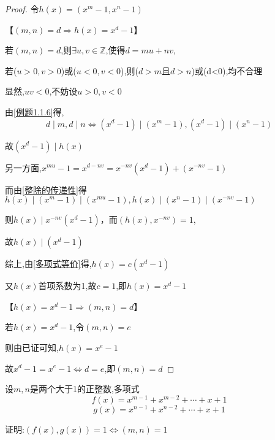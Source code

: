 \begin{proof}
    令$h(x)=(x^m-1,x^n-1)$

    【$(m,n)=d \Longrightarrow h(x)=x^d-1$】 

    若$(m,n)=d$,则$\exists u,v\in \mathbb{Z}$,使得$d=mu+nv$,

    若($u>0,v>0$)或($u<0,v<0$),则($d>m$且$d>n$)或(d<0),均不合理

    显然,$uv<0$,不妨设$u>0,v<0$

    由\cref{例题1.1.6}得,
    $$d\mid m,d\mid n \Longleftrightarrow (x^d-1)\mid (x^m-1),(x^d-1)\mid (x^n-1)$$

    故$(x^d-1)\mid h(x)$

    另一方面,$x^{mu}-1=x^{d-nv}=x^{-nv}(x^d-1)+(x^{-nv}-1)$

    而由\cref{整除的传递性}得$h(x)\mid (x^m-1)\mid (x^{mu}-1),h(x)\mid (x^n-1) \mid (x^{-nv}-1)$

    则$h(x)\mid x^{-nv}(x^d-1)$，而$(h(x),x^{-nv})=1$,
    
    故$h(x)\mid (x^d-1)$

    综上,由\cref{多项式等价}得,$h(x)=c(x^d-1)$

    又$h(x)$首项系数为1,故$c=1$,即$h(x)=x^d-1$

    【$ h(x)=x^d-1 \Longrightarrow (m,n)=d$】

    若$h(x)=x^d-1$,令$(m,n)=e$

    则由已证可知,$h(x)= x^e-1$

    故$x^d-1=x^e-1\Longleftrightarrow d=e$,即$(m,n)=d$
\end{proof}

\begin{example}
    设$m,n$是两个大于1的正整数,多项式
    \begin{equation*}
        f(x)=x^{m-1}+x^{m-2}+\cdots + x + 1
    \end{equation*}
    \begin{equation*}
        g(x)=x^{n-1}+x^{n-2}+\cdots + x + 1
    \end{equation*}

    证明:$(f(x),g(x))=1 \Longleftrightarrow (m,n)=1$
\end{example}

